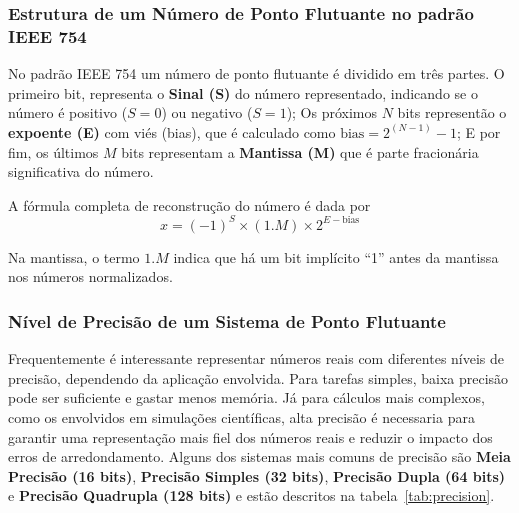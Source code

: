 \subsubsection{Estrutura de um Número de Ponto Flutuante no padrão IEEE 754}

No padrão IEEE 754 \cite{IEEE754} um número de ponto flutuante é dividido em
três partes. O primeiro bit, representa o \textbf{Sinal (S)} do número
representado, indicando se o número é positivo (\( S = 0 \)) ou negativo (\( S
= 1 \)); Os próximos $N$ bits representão o \textbf{expoente (E)} com viés
(bias), que é calculado como $\text{bias} = 2^{(N-1)} - 1$; E por fim, os
últimos $M$ bits representam a \textbf{Mantissa (M)} que é parte fracionária
significativa do número.

A fórmula completa de reconstrução do número é dada por
\[
  x = (-1)^S \times (1.M) \times 2^{E - \text{bias}}
\]

Na mantissa, o termo $1.M$ indica que há um bit implícito ``1'' antes da
mantissa nos números normalizados.
\subsubsection{Nível de Precisão de um Sistema de Ponto Flutuante}

Frequentemente é interessante representar números reais com diferentes níveis
de precisão, dependendo da aplicação envolvida. Para tarefas simples, baixa
precisão pode ser suficiente e gastar menos memória. Já para cálculos mais
complexos, como os envolvidos em simulações científicas, alta precisão é
necessaria para garantir uma representação mais fiel dos números reais e
reduzir o impacto dos erros de arredondamento. Alguns dos sistemas mais comuns
de precisão são \textbf{Meia Precisão (16 bits)}, \textbf{Precisão Simples (32
  bits)}, \textbf{Precisão Dupla (64 bits)} e \textbf{Precisão Quadrupla (128
  bits)} e estão descritos na tabela~\ref{tab:precision}.

